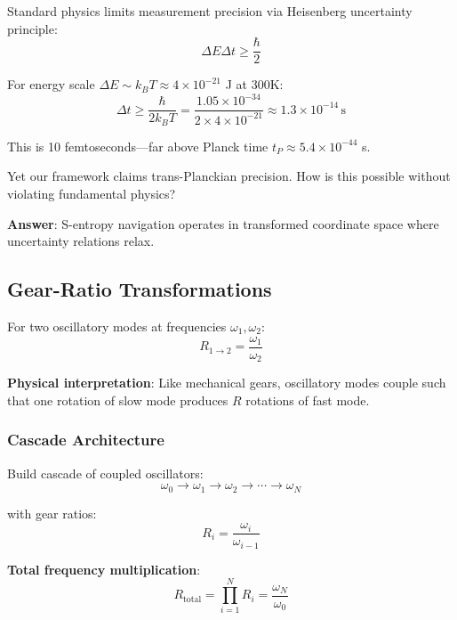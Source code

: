 \documentclass[11pt,onecolumn]{article}
\begin{document}
Standard physics limits measurement precision via Heisenberg uncertainty principle:
\begin{equation}
\Delta E \Delta t \geq \frac{\hbar}{2}
\end{equation}

For energy scale $\Delta E \sim k_B T \approx 4 \times 10^{-21}$ J at 300K:
\begin{equation}
\Delta t \geq \frac{\hbar}{2k_B T} = \frac{1.05 \times 10^{-34}}{2 \times 4 \times 10^{-21}} \approx 1.3 \times 10^{-14}\,\text{s}
\end{equation}

This is 10 femtoseconds---far above Planck time $t_P \approx 5.4 \times 10^{-44}$ s.

Yet our framework claims trans-Planckian precision. How is this possible without violating fundamental physics?

\textbf{Answer}: S-entropy navigation operates in transformed coordinate space where uncertainty relations relax.

\subsection{Gear-Ratio Transformations}

\begin{definition}
For two oscillatory modes at frequencies $\omega_1, \omega_2$:
\begin{equation}
R_{1 \to 2} = \frac{\omega_1}{\omega_2}
\end{equation}
\end{definition}

\textbf{Physical interpretation}: Like mechanical gears, oscillatory modes couple such that one rotation of slow mode produces $R$ rotations of fast mode.

\subsubsection{Cascade Architecture}

Build cascade of coupled oscillators:
\begin{equation}
\omega_0 \to \omega_1 \to \omega_2 \to \cdots \to \omega_N
\end{equation}

with gear ratios:
\begin{equation}
R_i = \frac{\omega_i}{\omega_{i-1}}
\end{equation}

\textbf{Total frequency multiplication}:
\begin{equation}
R_{\text{total}} = \prod_{i=1}^{N} R_i = \frac{\omega_N}{\omega_0}
\end{equation}
\end{document}
